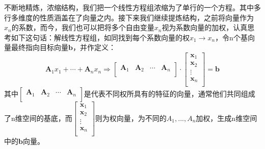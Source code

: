 \documentclass[fontset=none]{ctexart}
\begin{document}
不断地精炼，浓缩结构，我们把一个线性方程组浓缩为了单行的一个方程。其中多行多维度的性质涵盖在了向量之内。接下来我们继续提炼结构，之前将向量作为$x_n$的系数，而今，我们也可以把将多个自由变量$x_n$视为系数向量的加权，认真思考如下这句话：解线性方程组，如同找到每个系数向量的权$x_1\to x_n$，令n个基向量最终指向目标向量$\boldsymbol{b}$，并作定义：
$$\boldsymbol{A}_1x_1+\cdots +\boldsymbol{A}_nx_n\Longrightarrow \left[ \begin{matrix}
	\boldsymbol{A}_1&		\boldsymbol{A}_2&		\cdots&		\boldsymbol{A}_n\\
\end{matrix} \right] \cdot \left[ \begin{array}{c}
	\boldsymbol{x}_1\\
	\boldsymbol{x}_2\\
	\vdots\\
	\boldsymbol{x}_n\\
\end{array} \right]=\boldsymbol{b} $$
其中$\left[ \begin{matrix}
	\boldsymbol{A}_1&		\boldsymbol{A}_2&		\cdots&		\boldsymbol{A}_n\\
\end{matrix} \right]$是代表不同权所具有的特征的向量，通常他们共同组成了n维空间的基底，而$\left[ \begin{array}{c}
	\boldsymbol{x}_1\\
	\boldsymbol{x}_2\\
	\vdots\\
	\boldsymbol{x}_n\\
\end{array} \right]$则为权向量，为不同的$A_1,...,A_n$加权，生成n维空间中的$\boldsymbol{b}$向量。
\end{document}
